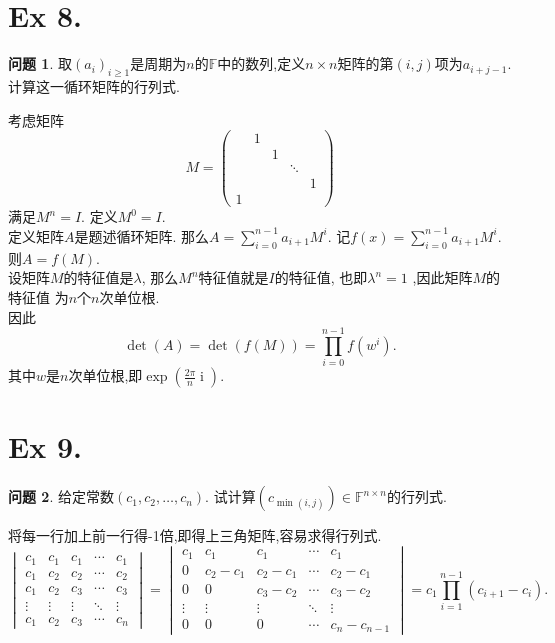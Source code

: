 \documentclass[11pt]{ctexart}
\theoremstyle{definition}
\newtheorem{qqq}{问题}[section]
\numberwithin{equation}{section}
\newcommand{\op}[1]{\operatorname{#1}}%
\begin{document}
\[{}\]
\[{}\]
\section{Ex 8.}
\begin{qqq}
    取$(a_i)_{i \geq 1}$是周期为$n$的$\mathbb{F}$中的数列,定义$n \times n$矩阵的第$(i,j)$项为$a_{i+j-1}$.计算这一循环矩阵的行列式.
\end{qqq}
\begin{aaa}
    考虑矩阵\[M=\begin{pmatrix}
        &1\\&&1\\&&&\ddots\\&&&&1\\1
    \end{pmatrix}\]
    满足$M^{n}=I$. 定义$M^0=I$.\\
    定义矩阵$A$是题述循环矩阵. 那么$A=\sum \limits _{i=0}^{n-1}a_{i+1}M^{i}.$ 
    记$f(x)=\sum\limits_{i=0}^{n-1}a_{i+1}M^i.$ 则$A=f(M).$\\
    设矩阵$M$的特征值是$\lambda$,  那么$M^n$特征值就是$I$的特征值, 也即$\lambda^n=1$ ,因此矩阵$M$的特征值 为$n$个$n$次单位根.\\
    因此\[\det(A)=\det(f(M))=\prod_{i=0}^{n-1}f(w^i).\]
    其中$w$是$n$次单位根,即$\exp{(\frac{2\pi}{n}\op{i})}.$
\end{aaa}


\section{Ex 9.}
\begin{qqq}
    给定常数$(c_1,c_2,\ldots,c_n)$. 试计算$(c_{\min(i,j)})\in \mathbb{F}^{n\times n}$的行列式. 

\end{qqq}
\begin{aaa}
    将每一行加上前一行得-1倍,即得上三角矩阵,容易求得行列式.
    \[
    \begin{vmatrix}
        c_1&c_1&c_1&\cdots&c_1\\
        c_1&c_2&c_2&\cdots&c_2\\
        c_1&c_2&c_3&\cdots&c_3\\
        \vdots&\vdots&\vdots&\ddots&\vdots\\
        c_1&c_2&c_3&\cdots&c_n
    \end{vmatrix}
    =
    \begin{vmatrix}
        c_1&c_1&c_1&\cdots&c_1\\
        0&c_2-c_1&c_2-c_1&\cdots&c_2-c_1\\
        0&0&c_3-c_2&\cdots&c_3-c_2\\
        \vdots&\vdots&\vdots&\ddots&\vdots\\
        0&0&0&\cdots&c_n-c_{n-1}
    \end{vmatrix}
    =c_1\prod_{i=1}^{n-1}(c_{i+1}-c_i).
    \]
\end{aaa}
\end{document}
